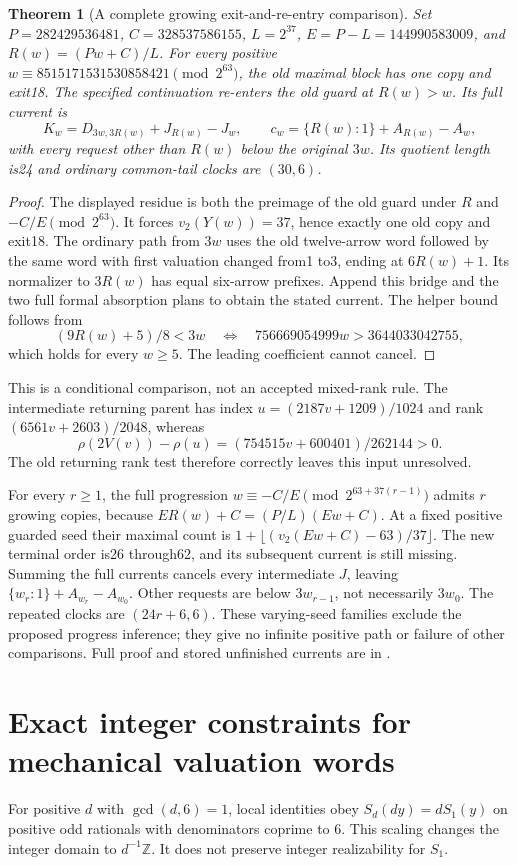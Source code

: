 \documentclass[11pt]{article}
\newtheorem{theorem}{Theorem}
\begin{document}
\begin{theorem}[A complete growing exit-and-re-entry comparison]
\label{thm:mixedreentry}
Set $P=282429536481$, $C=328537586155$, $L=2^{37}$,
$E=P-L=144990583009$, and $R(w)=(Pw+C)/L$.
For every positive $w\equiv8515171531530858421\pmod {2^{63}}$,
the old maximal block has one copy and exit18. The specified continuation
re-enters the old guard at $R(w)>w$. Its full current is
\[
 K_w=D_{3w,3R(w)}+J_{R(w)}-J_w,
 \qquad c_w=\{R(w):1\}+A_{R(w)}-A_w,
\]
with every request other than $R(w)$ below the original $3w$.
Its quotient length is24 and ordinary common-tail clocks are $(30,6)$.
\end{theorem}
\begin{proof}
The displayed residue is both the preimage of the old guard under $R$
and $-C/E\pmod {2^{63}}$. It forces $v_2(Y(w))=37$, hence exactly
one old copy and exit18. The ordinary path from $3w$ uses the old
twelve-arrow word followed by the same word with first valuation changed
from1 to3, ending at $6R(w)+1$. Its normalizer to $3R(w)$ has equal
six-arrow prefixes. Append this bridge and the two full formal absorption
plans to obtain the stated current. The helper bound follows from
\[
 (9R(w)+5)/8<3w
 \quad\Longleftrightarrow\quad
 756669054999w>3644033042755,
\]
which holds for every $w\geq5$. The leading coefficient cannot cancel.
\end{proof}
This is a conditional comparison, not an accepted mixed-rank rule.
The intermediate returning parent has index
$u=(2187v+1209)/1024$ and rank $(6561v+2603)/2048$, whereas
\[
 \rho(2V(v))-\rho(u)=(754515v+600401)/262144>0.
\]
The old returning rank test therefore correctly leaves this input unresolved.

For every $r\geq1$, the full progression
$w\equiv-C/E\pmod {2^{63+37(r-1)}}$ admits $r$ growing copies,
because $ER(w)+C=(P/L)(Ew+C)$. At a fixed positive guarded seed
their maximal count is $1+\lfloor(v_2(Ew+C)-63)/37\rfloor$.
The new terminal order is26 through62, and its subsequent current is
still missing. Summing the full currents cancels every intermediate
$J$, leaving $\{w_r:1\}+A_{w_r}-A_{w_0}$. Other requests are below
$3w_{r-1}$, not necessarily $3w_0$. The repeated clocks are $(24r+6,6)$.
These varying-seed families exclude the proposed progress inference;
they give no infinite positive path or failure of other comparisons.
Full proof and stored unfinished currents are in
.

\section{Exact integer constraints for mechanical valuation words}
\label{sec:balanceddenominators}
For positive $d$ with $\gcd(d,6)=1$, local identities obey
$S_d(dy)=dS_1(y)$ on positive odd rationals with
denominators coprime to $6$. This scaling changes the integer domain to
$d^{-1}\mathbb Z$. It does not preserve integer realizability for $S_1$.
\end{document}
